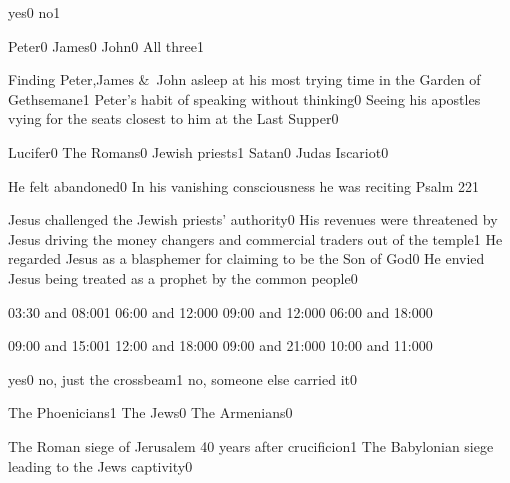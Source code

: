 {yes}{0}
{no}{1}
\qstop

{Peter}{0}
{James}{0}
{John}{0}
{All three}{1}
\qstop

{Finding Peter,James \&\ John asleep at his most trying time in the Garden of Gethsemane}{1}
{Peter's habit of speaking without thinking}{0}
{Seeing his apostles vying for the seats closest to him at the Last Supper}{0}
\qstop

{Lucifer}{0}
{The Romans}{0}
{Jewish priests}{1}
{Satan}{0}
{Judas Iscariot}{0}
\qstop

{He felt abandoned}{0}
{In his vanishing consciousness he was reciting Psalm 22}{1}
\qstop

{Jesus challenged the Jewish priests' authority}{0}
{His revenues were threatened by Jesus driving the money changers and commercial traders out of the temple}{1}
{He regarded Jesus as a blasphemer for claiming to be the Son of God}{0}
{He envied Jesus being treated as a prophet by the common people}{0}
\qstop

{03:30 and 08:00}{1}
{06:00 and 12:00}{0}
{09:00 and 12:00}{0}
{06:00 and 18:00}{0}
\qstop

{09:00 and 15:00}{1}
{12:00 and 18:00}{0}
{09:00 and 21:00}{0}
{10:00 and 11:00}{0}
\qstop

{yes}{0}
{no, just the crossbeam}{1}
{no, someone else carried it}{0}
\qstop

{The Phoenicians}{1}
{The Jews}{0}
{The Armenians}{0}
\qstop

{The Roman siege of Jerusalem 40 years after crucificion}{1}
{The Babylonian siege leading to the Jews captivity}{0}
\qstop


